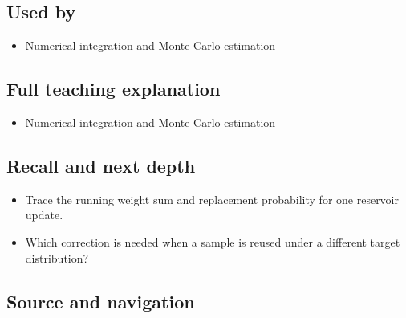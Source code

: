 \subsection{Used by}\label{used-by}

\begin{itemize}
\tightlist
\item
  \href{Continuous\%20Notes/University\%20-\%20Worlds,\%20Images\%20and\%20Inference\%20-\%20Graphics,\%20Vision\%20and\%20Photography\#Numerical\%20integration\%20and\%20Monte\%20Carlo\%20estimation}{Numerical integration and Monte Carlo estimation}
\end{itemize}

\subsection{Full teaching explanation}\label{full-teaching-explanation}

\begin{itemize}
\tightlist
\item
  \href{Continuous\%20Notes/University\%20-\%20Worlds,\%20Images\%20and\%20Inference\%20-\%20Graphics,\%20Vision\%20and\%20Photography\#Numerical\%20integration\%20and\%20Monte\%20Carlo\%20estimation}{Numerical integration and Monte Carlo estimation}
\end{itemize}

\subsection{Recall and next depth}\label{recall-and-next-depth}

\begin{itemize}
\tightlist
\item
  Trace the running weight sum and replacement probability for one reservoir update.
\item
  Which correction is needed when a sample is reused under a different target distribution?
\end{itemize}

\subsection{Source and navigation}\label{source-and-navigation}

